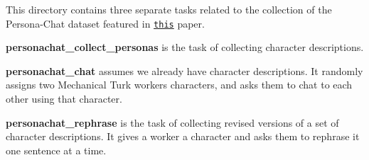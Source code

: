 This directory contains three separate tasks related to the collection of the Persona-\/\+Chat dataset featured in \href{https://arxiv.org/pdf/1801.07243.pdf}{\tt this} paper.


\begin{DoxyEnumerate}
\item {\bfseries personachat\+\_\+collect\+\_\+personas} is the task of collecting character descriptions.
\item {\bfseries personachat\+\_\+chat} assumes we already have character descriptions. It randomly assigns two Mechanical Turk workers characters, and asks them to chat to each other using that character.
\item {\bfseries personachat\+\_\+rephrase} is the task of collecting revised versions of a set of character descriptions. It gives a worker a character and asks them to rephrase it one sentence at a time. 
\end{DoxyEnumerate}